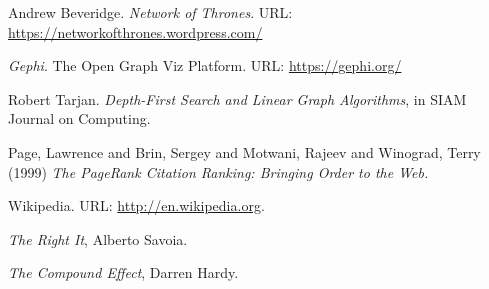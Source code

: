 \documentclass[a4paper,10pt,twocolumn]{article}
\begin{document}
\begin{thebibliography}{99}
	 Andrew Beveridge. \emph{Network of Thrones}.
		URL: \href{https://networkofthrones.wordpress.com/}{https://networkofthrones.wordpress.com/}

         \emph{Gephi}. The Open Graph Viz Platform. URL: \href{https://gephi.org/}{https://gephi.org/}


	 Robert Tarjan. \emph{Depth-First Search and Linear Graph Algorithms}, in SIAM Journal on Computing.

         Page, Lawrence and Brin, Sergey and Motwani, Rajeev and Winograd, Terry (1999) \emph{The PageRank Citation Ranking: Bringing Order to the Web.}

	 Wikipedia. URL: \href{http://en.wikipedia.org}
	  {http://en.wikipedia.org}.

         \emph{The Right It}, Alberto Savoia.

        \bibitem{} \emph{The Compound Effect}, Darren Hardy.

\end{thebibliography}


\label{end}
\end{document}
